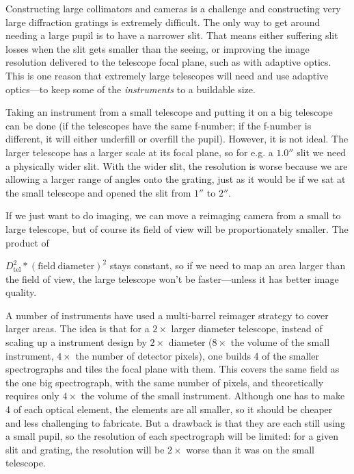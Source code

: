 \documentclass[12pt]{article}
\newcommand{\subscript}[1]{\mathrm{#1}}
\newcommand{\tel}{\subscript{tel}}
\begin{document}
Constructing
large collimators and cameras is a challenge and constructing
very large diffraction gratings is extremely difficult.
The only way to get around needing a large pupil is to have
a narrower slit.  That means either suffering slit losses when the
slit gets smaller than the seeing, or improving
the image resolution delivered to the telescope focal plane, such as
with adaptive optics.  This is one reason that extremely large
telescopes will need and use adaptive optics---to keep some of 
the {\it instruments} to a buildable size.

Taking an instrument from a small telescope and putting it on
a big telescope can be done (if the telescopes have the same 
f-number; if the f-number is different, it will either underfill
or overfill the pupil).  However, it is not ideal.  The larger
telescope has a larger scale at its focal plane, so for e.g.
a $1.0''$ slit we need a physically wider slit.  With the wider
slit, the resolution is worse because we are allowing a 
larger range of angles onto the grating, just as it would 
be if we sat at the small telescope and opened the slit from $1''$ to $2''$.

If we just want to do imaging, we can move a reimaging camera
from a small to large telescope, but of course its field of
view will be proportionately smaller.  The product of 

$D_{\tel}^2 * (\mathrm{field\ diameter})^2$ stays constant, so if we need to
map an area larger than the field of view, the large telescope won't be
faster---unless it has better image quality.

A number of instruments have used a multi-barrel reimager
strategy to cover larger areas.  The idea is that for a $2\times$ larger
diameter
telescope, instead of scaling up a instrument design by $2\times$ diameter
($8\times$ the volume of the small instrument, $4\times$ the number of detector
pixels), one builds 4 of the 
smaller spectrographs and tiles the focal plane with them.  This 
covers the same field as the one big spectrograph, with the same
number of pixels, and theoretically
requires only $4\times$ the volume of the small instrument.  Although one
has to make 4 of each optical element, the elements are all smaller, 
so it should be cheaper and less challenging to fabricate.  But a 
drawback is that they are each still
using a small pupil, so the resolution of each spectrograph 
will be limited: for a given slit and grating, the resolution will
be $2\times$ worse than it was on the small telescope.
\end{document}
